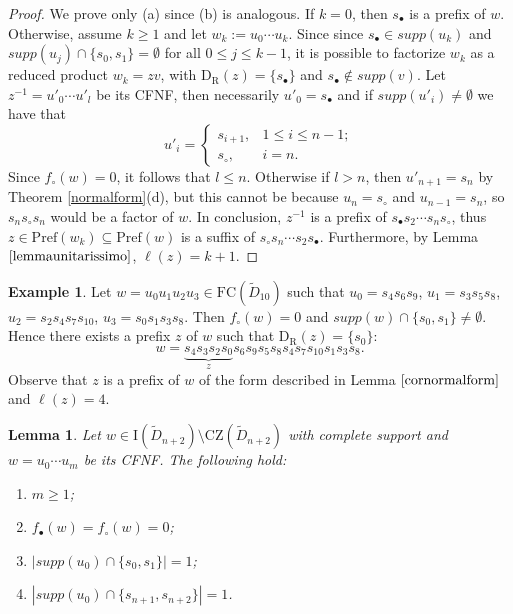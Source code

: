 \documentclass{amsart}
\newcommand{\D}{{\widetilde{D}_{n+2}}}
\newcommand{\rd}{{\mathrm{D}_{\mathrm{R}}}}
\newcommand{\fc}{{\mathrm{FC}}}
\newcommand{\s}{{s_{\bullet}}}
\newcommand{\sn}{{s_\circ}}
\newcommand{\pr}{\mathrm{Pref}}
\newcommand{\zz}{\mathrm{CZ}}
\newcommand{\I}{\mathrm{I}}
\newtheorem{Lemma}[Theorem]{Lemma}
\theoremstyle{definition}
\newtheorem{Example}[Theorem]{Example}
\begin{document}
\begin{proof}
We prove only (a) since (b) is analogous. If $k=0$, then  $\s$ is a prefix of $w$. Otherwise, assume $k\ge 1$ and let $w_k:=u_0\cdots u_k$. Since since $ \s\in supp(u_k)$ and $supp(u_j)\cap \{s_0,s_1\}=\emptyset$ for all $0\le j\le k-1$, it is possible to factorize $w_k$ as a reduced product $w_k=zv$, with $\rd(z)=\{\s\}$ and $\s \notin supp(v)$. Let $z^{-1}=u'_0\cdots u'_l$ be its CFNF, then necessarily $u'_0=\s$ and if $supp(u'_i)\ne \emptyset$ we have that
\[u'_i=\begin{cases}
    s_{i+1}, & 1\le i\le n-1;\\ \sn, & i=n.
    \end{cases}\] 
Since $f_\circ(w)=0$, it follows that $l\le n$. Otherwise if $l>n$, then $u'_{n+1}=s_n$ by Theorem \ref{normalform}(d), but this cannot be because $u_n=\sn$ and $u_{n-1}=s_n$, so $s_n\sn s_n$ would be a factor of $w$. In conclusion, $z^{-1}$ is a prefix of $\s s_2\cdots s_n \sn$, thus $z\in \pr(w_k)\subseteq \pr(w)$ is a suffix of $\sn s_n\cdots s_2 \s$. Furthermore, by Lemma $\ref{lemmaunitarissimo}$, $\ell(z)=k+1$.
\end{proof}

\begin{Example}
\label{excorlemmanf}
Let $w=u_0u_1u_2u_3\in \fc(\widetilde{D}_{10})$ such that $u_0=s_4s_6s_9$, $u_{1}=s_3s_5s_8$, $u_2=s_2s_4s_7s_{10}$, $u_3=s_0s_1s_3s_8$. Then $f_\circ(w)=0$ and $supp(w)\cap \{s_0,s_1\}\ne \emptyset$. Hence there exists a prefix $z$ of $w$ such that $\rd(z)=\{s_0\}$: \[w=\underbrace{s_4s_3s_2s_0}_{z}s_6s_9s_5s_8s_4s_7s_{10}s_1s_3s_8.\] Observe that $z$ is a prefix of $w$ of the form described in Lemma $\ref{cornormalform}$ and $\ell(z)=4$.
\end{Example}

\begin{Lemma}
\label{lemma:caruno}
Let $w\in \I(\D)\setminus \zz(\D)$ with complete support and $w=u_0\cdots u_m$ be its CFNF. The following hold:
\begin{enumerate}
    \item[(a)]  $m\ge 1$;
    \item[(b)]  $f_\bullet(w)=f_\circ(w)=0$;
    \item[(c)]  $\left |supp(u_0)\cap \{s_0,s_1\}\right |=1$;
    \item[(d)]  $\left |supp(u_0)\cap \{s_{n+1},s_{n+2}\}\right |=1$.
\end{enumerate}

\end{Lemma}
\end{document}
